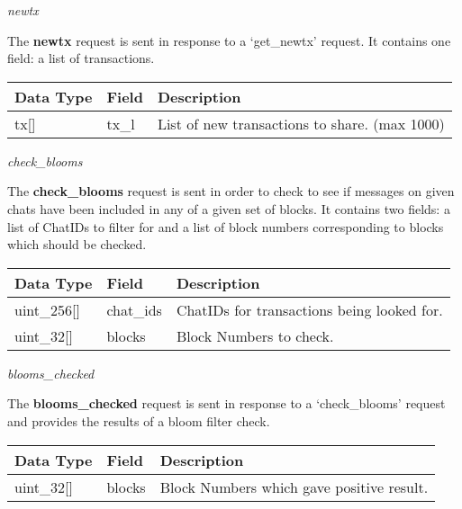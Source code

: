 \documentclass{article}
\begin{document}
\begin{center}
    \large \textit{newtx}
\end{center}
The \textbf{newtx} request is sent in response to a `get\_newtx' request. It contains one field: a list of transactions.
\begin{table}[H]
\centering
\begin{tabular}{|p{2.2cm}|p{3cm}|p{5.5cm}|}
\hline
\rowcolor{tblgrey}
Data Type   & Field       & Description\\ \hline
tx[\hspace{0.05cm}] & tx\_l & List of new transactions to share. (max 1000)                  \\ \hline
\end{tabular}
\end{table}

\begin{center}
    \large \textit{check\_blooms}
\end{center}
The \textbf{check\_blooms} request is sent in order to check to see if messages on given chats have been included in any of a given set of blocks. It contains two fields: a list of ChatIDs to filter for and a list of block numbers corresponding to blocks which should be checked.
\begin{table}[H]
\centering
\begin{tabular}{|p{1.6cm}|p{2.5cm}|p{5.5cm}|}
\hline
\rowcolor{tblgrey}
Data Type   & Field       & Description\\ \hline
uint\_256[\hspace{0.05cm}]& chat\_ids    & ChatIDs for transactions being looked for.   \\ \hline
uint\_32[\hspace{0.05cm}] & blocks  & Block Numbers to check.       \\ \hline
\end{tabular}
\end{table}

\begin{center}
    \large \textit{blooms\_checked}
\end{center}
The \textbf{blooms\_checked} request is sent in response to a `check\_blooms' request and provides the results of a bloom filter check.
\begin{table}[H]
\centering
\begin{tabular}{|p{1.5cm}|p{2.5cm}|p{5.5cm}|}
\hline
\rowcolor{tblgrey}
Data Type   & Field       & Description\\ \hline
uint\_32[\hspace{0.05cm}] & blocks  & Block Numbers which gave positive result.       \\ \hline
\end{tabular}
\end{table}
\end{document}
